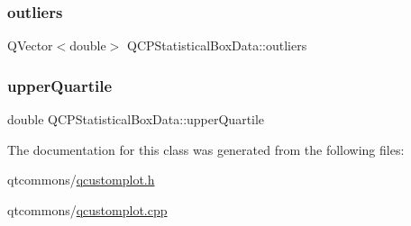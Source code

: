 \mbox{\label{class_q_c_p_statistical_box_data_abaa27539fbd941d3f1eb8169e881e308}} 
\subsubsection{\texorpdfstring{outliers}{outliers}}
{\footnotesize\ttfamily Q\+Vector$<$double$>$ Q\+C\+P\+Statistical\+Box\+Data\+::outliers}

\mbox{\label{class_q_c_p_statistical_box_data_a5604dfe04b103e5ac73ce7895b46303b}} 
\subsubsection{\texorpdfstring{upperQuartile}{upperQuartile}}
{\footnotesize\ttfamily double Q\+C\+P\+Statistical\+Box\+Data\+::upper\+Quartile}



The documentation for this class was generated from the following files\+:\begin{DoxyCompactItemize}
\item 
qtcommons/\mbox{\hyperlink{qcustomplot_8h}{qcustomplot.\+h}}\item 
qtcommons/\mbox{\hyperlink{qcustomplot_8cpp}{qcustomplot.\+cpp}}\end{DoxyCompactItemize}

